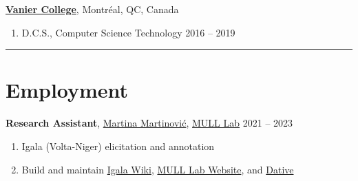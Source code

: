 \documentclass[margin,line]{resume}
\begin{document}
\begin{resume}
	\href{https://www.vaniercollege.qc.ca/}{\textbf{Vanier College}}, Montréal, QC, Canada
	\begin{enumerate}[-, leftmargin=1em, topsep=4pt]
		\item[]  D.C.S., Computer Science Technology \hfill 2016 -- 2019
	\end{enumerate}

	\vspace{-1.2em}\rule{\textwidth}{0.4pt}





	\section{\mysidestyle Employment}

	\textbf{Research Assistant}, \href{https://inamartinovic.com/}{Martina Martinović}, \href{https://mull-lab.org/}{MULL Lab} \hfill 2021 -- 2023
	\begin{enumerate}[-, leftmargin=1em, topsep=4pt]
		\item[] Igala (Volta-Niger) elicitation and annotation
		\item[] Build and maintain \href{https://wiki.mull-lab.org/Igala/}{Igala Wiki}, \href{https://mull-lab.org/}{MULL Lab Website}, and \href{https://github.com/dativebase/dativerf}{Dative}
	\end{enumerate}%

	\begin{comment}
	\textbf{Full Stack and Mobile Developer}, \href{https://playmind.com/}{PLAYMIND}, Montréal \hfill Mar -- Aug 2021
	\begin{enumerate}[-, leftmargin=1em, topsep=4pt]
		\item[] Developed~\href{https://playbox.games/\#home}{
			      PLAYBOX online management portal and Android App}
	\end{enumerate}

	\textbf{Freelance Programmer}, Montréal \hfill 2019 -- 2020
	\begin{enumerate}[-, leftmargin=1em, topsep=4pt]
		\item[] Web Development and Python tutoring
	\end{enumerate}


\end{comment}
\end{resume}
\end{document}
